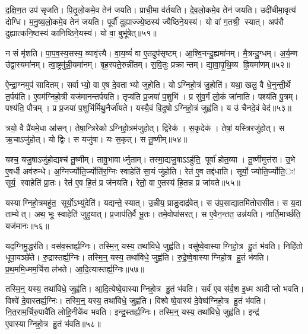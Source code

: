 द॒क्षि॒ण॒त उप॑ सृजति।
पि॒तृ॒लो॒कमे॒व तेन॑ जयति।
प्राची॒मा व॑र्तयति।
दे॒व॒लो॒कमे॒व तेन॑ जयति।
उदी॑चीमा॒वृत्य॑ दोग्धि।
म॒नु॒ष्य॒लो॒कमे॒व तेन॑ जयति।
पूर्वौ॑ दुह्याज्ज्ये॒ष्ठस्य॑ ज्यैष्ठिने॒यस्य॑।
यो वा॑ ग॒तश्री॒ स्यात्।
अप॑रौ दुह्यात्कनि॒ष्ठस्य॑ कानिष्ठिने॒यस्य॑।
यो वा॒ बुभू॑षेत्॥५१॥

न सं मृ॑शति।
पा॒प॒व॒स्य॒सस्य॒ व्यावृ॑त्त्यै।
वा॒य॒व्यं॑ वा ए॒तदुप॑सृष्टम्।
आ॒श्वि॒नन्दु॒ह्यमा॑नम्।
मै॒त्रन्दु॒ग्धम्।
अ॒र्य॒म्ण उ॑द्वा॒स्यमा॑नम्।
त्वा॒ष्ट्रमु॑न्नी॒यमा॑नम्।
बृह॒स्पते॒रुन्नी॑तम्।
स॒वि॒तुः प्रक्रान्तम्।
द्या॒वा॒पृ॒थि॒व्य ह्रि॒यमा॑णम्॥५२॥

ऐ॒न्द्रा॒ग्नमुप॑ सादितम्।
सर्वाभ्यो॒ वा ए॒ष दे॒वताभ्यो जुहोति।
योऽग्निहो॒त्रं जु॒होति॑।
यथा॒ खलु॒ वै धे॒नुन्ती॒र्थे त॒र्पय॑ति।
ए॒वम॑ग्निहो॒त्री यज॑मानन्तर्पयति।
तृप्य॑ति प्र॒जया॑ प॒शुभि॑।
प्र सु॑व॒र्गं लो॒कं जा॑नाति।
पश्य॑ति पु॒त्रम्।
पश्य॑ति॒ पौत्रम्।
प्र प्र॒जया॑ प॒शुभि॑र्मिथु॒नैर्जा॑यते।
यस्यै॒वं वि॒दुषोऽग्निहो॒त्रं जुह्व॑ति।
य उ॑ चैनदे॒वं वेद॑॥५३॥\anuvakamend[बुभू॑षेद्ध्रि॒यमा॑णञ्जायते॒ द्वे च॑]

त्रयो॒ वै प्रै॑यमे॒धा आ॑सन्।
तेषा॒न्त्रिरेकोऽग्निहो॒त्रम॑जुहोत्।
द्विरेक॑।
स॒कृदेक॑।
तेषां॒ यस्त्रिरजु॑होत्।
स ऋ॒चाऽजु॑होत्।
यो द्विः।
स यजु॑षा।
यः स॒कृत्।
स तू॒ष्णीम्॥५४॥

यश्च॒ यजु॒षाऽजु॑हो॒द्यश्च॑ तू॒ष्णीम्।
तावु॒भावार्ध्नुताम्।
तस्मा॒द्यजु॒षाऽऽहु॑ति॒ पूर्वा॑ होत॒व्या।
तू॒ष्णीमुत्त॑रा।
उ॒भे ए॒वर्धी अव॑रुन्धे।
अ॒ग्निर्ज्योति॒र्ज्योति॑र॒ग्निः स्वाहेति॑ सा॒यं जु॑होति।
रेत॑ ए॒व तद्द॑धाति।
सूर्यो॒ ज्योति॒र्ज्योति॒ः! सूर्य॒ स्वाहेति॑ प्रा॒तः।
रेत॑ ए॒व हि॒तं प्र ज॑नयति।
रेतो॒ वा ए॒तस्य॑ हि॒तन्न प्र जा॑यते॥५५॥

यस्याग्निहो॒त्रमहु॑त॒ सूर्यो॒ऽभ्यु॑देति॑।
यद्यन्ते॒ स्यात्।
उ॒न्नीय॒ प्राङु॒दाद्र॑वेत्।
स उ॑प॒साद्यातमि॑तोरासीत।
स य॒दा ताम्येत्।
अथ॒ भूः स्वाहेति॑ जुहुयात्।
प्र॒जाप॑ति॒र्वै भू॒तः।
तमे॒वोपा॑सरत्।
स ए॒वैन॒न्तत॒ उन्न॑यति।
नार्ति॒मार्च्छ॑ति॒ यज॑मानः॥५६॥\anuvakamend[तू॒ष्णीञ्जा॑यते॒ यज॑मानः]

यद॒ग्निमु॒द्धर॑ति।
वस॑व॒स्तर्ह्य॒ग्निः।
तस्मि॒न्॒ यस्य॒ तथा॑विधे॒ जुह्व॑ति।
वसु॑ष्वे॒वास्याग्निहो॒त्र हु॒तं भ॑वति।
निहि॑तो धूपा॒यञ्छे॑ते।
रु॒द्रास्तर्ह्य॒ग्निः।
तस्मि॒न्॒ यस्य॒ तथा॑विधे॒ जुह्व॑ति।
रु॒द्रे॒ष्वे॒वास्याग्निहो॒त्र हु॒तं भ॑वति।
प्र॒थ॒ममि॒ध्मम॒र्चिरा ल॑भते।
आ॒दि॒त्यास्तर्ह्य॒ग्निः॥५७॥

तस्मि॒न्॒ यस्य॒ तथा॑विधे॒ जुह्व॑ति।
आ॒दि॒त्येष्वे॒वास्याग्निहो॒त्र हु॒तं भ॑वति।
सर्व॑ ए॒व स॑र्व॒श इ॒ध्म आदीप्तो भवति।
विश्वे॑ दे॒वास्तर्ह्य॒ग्निः।
तस्मि॒न्॒ यस्य॒ तथा॑विधे॒ जुह्व॑ति।
विश्वेष्वे॒वास्य॑ दे॒वेष्व॑ग्निहो॒त्र हु॒तं भ॑वति।
नि॒त॒राम॒र्चिरु॒पावै॑ति लोहि॒नीके॑व भवति।
इन्द्र॒स्तर्ह्य॒ग्निः।
तस्मि॒न्॒ यस्य॒ तथा॑विधे॒ जुह्व॑ति।
इन्द्र॑ ए॒वास्याग्निहो॒त्र हु॒तं भ॑वति॥५८॥

